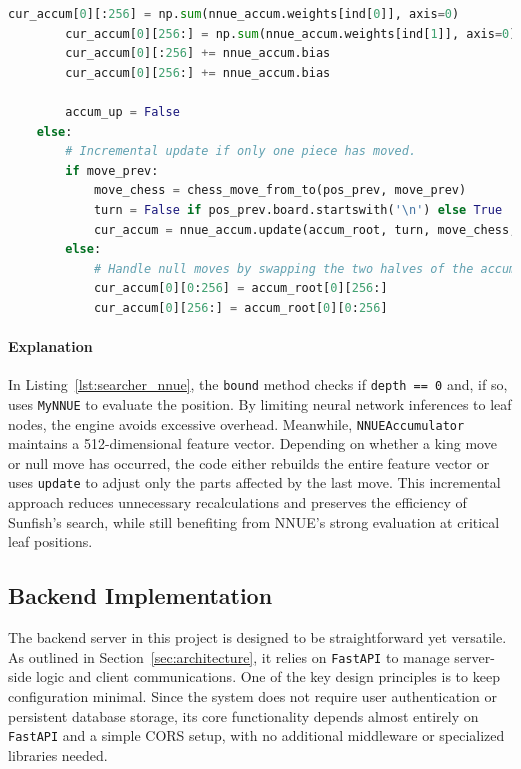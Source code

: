 \documentclass[12pt,a4paper]{article}
\begin{document}
\begin{lstlisting}[language=Python, caption={Refined Sunfish Searcher Code snippet with NNUE Integration}, label={lst:searcher_nnue}, basicstyle=\footnotesize\ttfamily, breaklines=true]
        cur_accum[0][:256] = np.sum(nnue_accum.weights[ind[0]], axis=0)
        cur_accum[0][256:] = np.sum(nnue_accum.weights[ind[1]], axis=0)
        cur_accum[0][:256] += nnue_accum.bias
        cur_accum[0][256:] += nnue_accum.bias

        accum_up = False
    else:
        # Incremental update if only one piece has moved.
        if move_prev:
            move_chess = chess_move_from_to(pos_prev, move_prev)
            turn = False if pos_prev.board.startswith('\n') else True
            cur_accum = nnue_accum.update(accum_root, turn, move_chess, kings)
        else:
            # Handle null moves by swapping the two halves of the accumulator
            cur_accum[0][0:256] = accum_root[0][256:]
            cur_accum[0][256:] = accum_root[0][0:256]
\end{lstlisting}

\paragraph{Explanation}
In Listing~\ref{lst:searcher_nnue}, the \texttt{bound} method checks if \texttt{depth == 0} and, if so, uses \texttt{MyNNUE} to evaluate the position. By limiting neural network inferences to leaf nodes, the engine avoids excessive overhead. Meanwhile, \texttt{NNUEAccumulator} maintains a 512-dimensional feature vector. Depending on whether a king move or null move has occurred, the code either rebuilds the entire feature vector or uses \texttt{update} to adjust only the parts affected by the last move. This incremental approach reduces unnecessary recalculations and preserves the efficiency of Sunfish’s search, while still benefiting from NNUE’s strong evaluation at critical leaf positions.

  

\subsection{Backend Implementation}
The backend server in this project is designed to be straightforward yet versatile. As outlined in Section~\ref{sec:architecture}, it relies on \texttt{FastAPI} to manage server-side logic and client communications. One of the key design principles is to keep configuration minimal. Since the system does not require user authentication or persistent database storage, its core functionality depends almost entirely on \texttt{FastAPI} and a simple CORS setup, with no additional middleware or specialized libraries needed.
\end{document}
